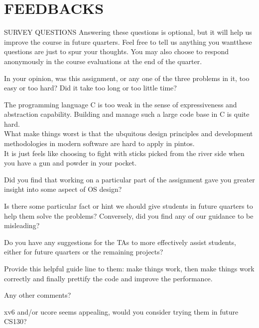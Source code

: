 \section*{FEEDBACKS}
\begin{aspect}{SURVEY QUESTIONS}
	Answering these questions is optional, but it will help us improve the course in future quarters.
	Feel free to tell us anything you wantthese questions are just to spur your thoughts.
	You may also choose to respond anonymously in the course evaluations at the end of the quarter.

	\begin{qc}
		\textbullet
		In your opinion, was this assignment, or any one of the three problems in it, too easy or too hard?
		Did it take too long or too little time?
	\end{qc}
	The programming language C is too weak in the sense of expressiveness and abstraction capability.
	Building and manage such a large code base in C is quite hard. \\
	What make things worst is that the ubquitous design principles and development methodologies in modern software are hard to apply in pintos.\\
	It is just feels like choosing to fight with sticks picked from the river side when you have a gun and powder in your pocket.

	\begin{qc}
		\textbullet
		Did you find that working on a particular part of the assignment gave you greater insight into some aspect of OS design?
	\end{qc}

	\begin{qc}
		\textbullet
		Is there some particular fact or hint we should give students in future quarters to help them solve the problems?
		Conversely, did you find any of our guidance to be misleading?
	\end{qc}

	\begin{qc}
		\textbullet
		Do you have any suggestions for the TAs to more effectively assist students,
		either for future quarters or the remaining projects?
	\end{qc}
	Provide this helpful guide line to them: make things work, then make things work correctly and finally prettify the code and improve the performance.

	\begin{qc}
		\textbullet
		Any other comments?
	\end{qc}
	xv6 and/or ucore seems appealing, would you consider trying them in future CS130?
\end{aspect}




